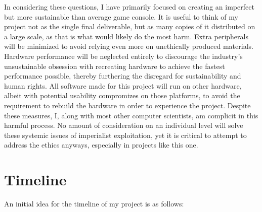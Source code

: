 \documentclass[10pt,twocolumn]{article}
\begin{document}
In considering these questions, I have primarily focused on creating an
imperfect but more sustainable than average game console. It is useful to think
of my project not as the single final deliverable, but as many copies of it
distributed on a large scale, as that is what would likely do the most harm.
Extra peripherals will be minimized to avoid relying even more on unethically
produced materials. Hardware performance will be neglected entirely to
discourage the industry's unsustainable obsession with recreating hardware to
achieve the fastest performance possible, thereby furthering the disregard for
sustainability and human rights. All software made for this project will run on
other hardware, albeit with potential usability compromizes on those platforms,
to avoid the requirement to rebuild the hardware in order to experience the
project. Despite these measures, I, along with most other computer scientists,
am complicit in this harmful process. No amount of consideration on an
individual level will solve these systemic issues of imperialist exploitation,
yet it is critical to attempt to address the ethics anyways, especially in
projects like this one.

\section{Timeline}

An initial idea for the timeline of my project is as follows:
\end{document}
